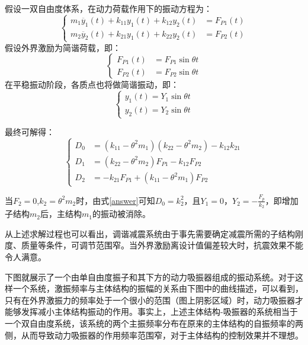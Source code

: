 	假设一双自由度体系，在动力荷载作用下的振动方程为：
	\begin{equation}
	\label{vibration}
	\left\{
	\begin{array}{rl}
	m_1\ddot{y_1}\left(t\right)+k_{11}y_1\left(t\right)+k_{12}y_2\left(t\right)&=F_{P1}\left(t\right)\\
	m_2\ddot{y_2}\left(t\right)+k_{21}y_1\left(t\right)+k_{22}y_2\left(t\right)&=F_{P2}\left(t\right)
	\end{array}
	\right.
	\end{equation}
	假设外界激励为简谐荷载，即：
	\begin{equation}
	\label{sin}
	\left\{
	\begin{array}{rl}
	F_{P1}\left(t\right)&=F_{P1}\sin \theta t\\
	F_{P2}\left(t\right)&=F_{P2}\sin \theta t
	\end{array}
	\right.
	\end{equation}
	在平稳振动阶段，各质点也将做简谐振动，即：
	\begin{equation}
	\label{sinMove}
	\left\{
	\begin{array}{rl}
	y_{1}\left(t\right)=Y_{1}\sin \theta t\\
	y_{2}\left(t\right)=Y_{2}\sin \theta t
	\end{array}
	\right.
	\end{equation}
	
	最终可解得：
	\begin{equation}
	\label{answer}
	\left\{
	\begin{array}{rl}
	D_0&=\left(k_{11}-\theta^2m_1\right)\left(k_{22}-\theta^2m_2\right)-k_{12}k_{21} \\
	D_1&=\left(k_{22}-\theta^2m_2\right)F_{P1}-k_{12}F_{P2} \\
	D_2&=-k_{21}F_{P1}+\left(k_{11}-\theta^2m_1\right)F_{P2}
	\end{array}
	\right.
	\end{equation}
	
	当$F_2=0$,$k_2=\theta^2m_2$时，由式\eqref{answer}可知$D_0=k_2^2$，且$Y_1=0$，$Y_2=-\frac{F_p}{k_2}$，即增加子结构$m_2$后，主结构$m_1$的振动被消除。
	
	从上述求解过程也可以看出，调谐减震系统由于事先需要确定减震所需的子结构刚度、质量等条件，可调节范围窄。当外界激励离设计值偏差较大时，抗震效果不能令人满意。
	
	下图就展示了一个由单自由度振子和其下方的动力吸振器组成的振动系统。对于这样一个系统，激振频率与主体结构的振幅的关系由下图中的曲线描述，可以看到，只有在外界激振力的频率处于一个很小的范围（图上阴影区域）时，动力吸振器才能够发挥减小主体结构振动的作用。事实上，上述主体结构-吸振器的系统相当于一个双自由度系统，该系统的两个主振频率分布在原来的主体结构的自振频率的两侧，从而导致动力吸振器的作用频率范围窄，对于主体结构的控制效果并不理想\cite{chopra2007}。
	
